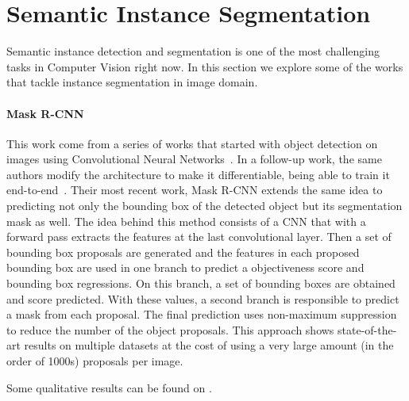 

\section{Semantic Instance Segmentation}
\label{sec:soa:instancesegmentation}

Semantic instance detection and segmentation is one of the most challenging tasks in Computer Vision right now.
In this section we explore some of the works that tackle instance segmentation in image domain.


\paragraph{Mask R-CNN~\maskrcnn}
This work come from a series of works that started with object detection on images using Convolutional Neural Networks~\fastrcnn. %
In a follow-up work, the same authors modify the architecture to make it differentiable, being able to train it end-to-end~\fasterrcnn. %
Their most recent work, Mask R-CNN extends the same idea to predicting not only the bounding box of the detected object but its segmentation mask as well.
The idea behind this method consists of a CNN that with a forward pass extracts the features at the last convolutional layer.
Then a set of bounding box proposals are generated and the features in each proposed bounding box are used in one branch to predict a objectiveness score and bounding box regressions.
On this branch, a set of bounding boxes are obtained and score predicted. With these values, a second branch is responsible to predict a mask from each proposal.
The final prediction uses non-maximum suppression to reduce the number of the object proposals.
This approach shows state-of-the-art results on multiple datasets at the cost of using a very large amount (in the order of 1000s) proposals per image.

Some qualitative results can be found on .

